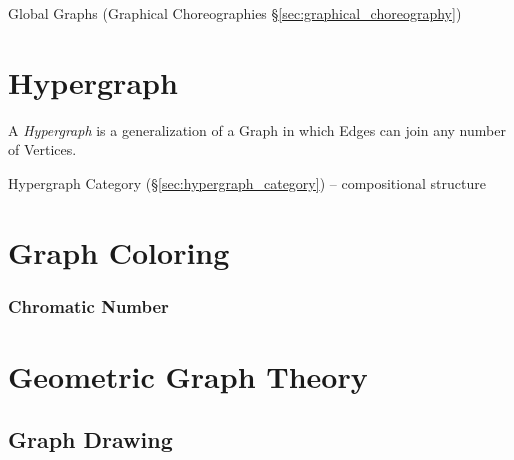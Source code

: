 \fist Global Graphs (Graphical Choreographies
\S\ref{sec:graphical_choreography})



\section{Hypergraph}\label{sec:hypergraph}

A \emph{Hypergraph} is a generalization of a Graph in which Edges can
join any number of Vertices.

\fist Hypergraph Category (\S\ref{sec:hypergraph_category}) --
compositional structure



\section{Graph Coloring}\label{sec:graph_coloring}

\subsubsection{Chromatic Number}\label{sec:chromatic_number}




\section{Geometric Graph Theory}\label{sec:geometric_graph_theory}

\subsection{Graph Drawing}\label{sec:graph_drawing}

